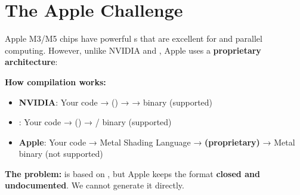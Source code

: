 \section{The Apple  Challenge}

Apple M3/M5 chips have powerful s that are excellent for  and parallel computing. However, unlike NVIDIA and , Apple uses a \textbf{proprietary  architecture}:

\textbf{How  compilation works:}

\begin{itemize}[noitemsep]
  \item \textbf{NVIDIA}: Your code →   () →  →  binary (supported)
  \item \textbf{}: Your code →   () → / binary (supported)
  \item \textbf{Apple}: Your code → Metal Shading Language\cite{metalspec} → \textbf{ (proprietary)} → Metal binary (not supported)
\end{itemize}

\textbf{The problem:}  is based on  , but Apple keeps the format \textbf{closed and undocumented}\cite{airformat}. We cannot generate it directly.

